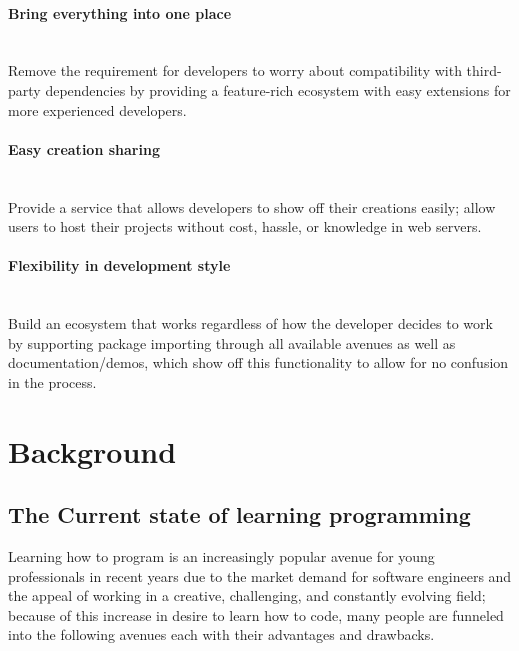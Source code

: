 \documentclass{l4proj}
\begin{document}
\subsubsection{Bring everything into one place} \hfill\\
\text Remove the requirement for developers to worry about compatibility with third-party dependencies by providing a feature-rich ecosystem with easy extensions for more experienced developers.
\\
\subsubsection{Easy creation sharing}\hfill\\
\text Provide a service that allows developers to show off their creations easily; allow users to host their projects without cost, hassle, or knowledge in web servers.
\\
\subsubsection{Flexibility in development style}\hfill\\
\text Build an ecosystem that works regardless of how the developer decides to work by supporting package importing through all available avenues as well as documentation/demos, which show off this functionality to allow for no confusion in the process.


\chapter{Background}

\section{The Current state of learning programming}

Learning how to program is an increasingly popular avenue for young professionals in recent years due to the market demand for software engineers and the appeal of working in a creative, challenging, and constantly evolving field; because of this increase in desire to learn how to code, many people are funneled into the following avenues each with their advantages and drawbacks.
\end{document}

